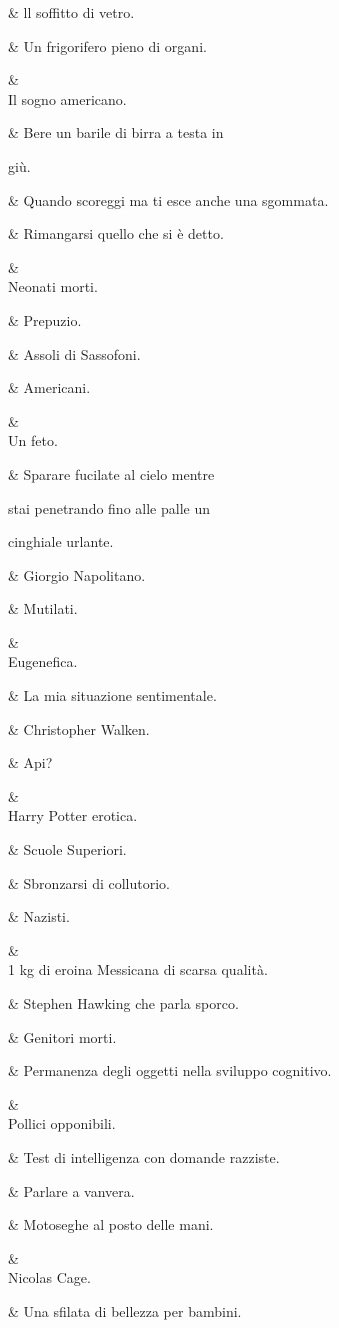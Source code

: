 &
ll soffitto di vetro.

&
Un frigorifero
pieno di organi.

&
\\
Il sogno
americano.

&
Bere un barile di
birra a testa in

giù.

&
Quando scoreggi
ma ti esce anche
una sgommata.

&
Rimangarsi
quello che si è
detto.

&
\\
Neonati morti.

&
Prepuzio.

&
Assoli di
Sassofoni.

&
Americani.

&
\\
Un feto.

&
Sparare fucilate
al cielo mentre

stai penetrando
fino alle palle un

cinghiale urlante.

&
Giorgio
Napolitano.

&
Mutilati.

&
\\
Eugeneﬁca.

&
La mia situazione
sentimentale.

&
Christopher
Walken.

&
Api?

&
\\
Harry Potter
erotica.

&
Scuole Superiori.

&
Sbronzarsi di
collutorio.

&
Nazisti.

&
\\
1 kg di eroina
Messicana di
scarsa qualità.

&
Stephen
Hawking che
parla sporco.

&
Genitori morti.

&
Permanenza
degli oggetti
nella sviluppo
cognitivo.

&
\\
Pollici opponibili.

&
Test di
intelligenza
con domande
razziste.

&
Parlare a
vanvera.

&
Motoseghe al
posto delle mani.

&
\\
Nicolas Cage.

&
Una sfilata di
bellezza per
bambini.

